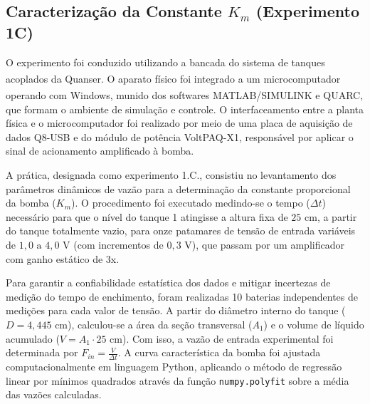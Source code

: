 \documentclass[a4paper,12pt]{article}
\begin{document}
\subsection{Caracterização da Constante $K_m$ (Experimento 1C)}
\begin{justify}
\hspace{4ex}O experimento foi conduzido utilizando a bancada do sistema de tanques acoplados da Quanser\textsuperscript{\textregistered}. O aparato físico foi integrado a um microcomputador operando com Windows, munido dos softwares MATLAB\textsuperscript{\textregistered}/SIMULINK\textsuperscript{\textregistered} e QUARC\textsuperscript{\textregistered}, que formam o ambiente de simulação e controle. O interfaceamento entre a planta física e o microcomputador foi realizado por meio de uma placa de aquisição de dados Q8-USB e do módulo de potência VoltPAQ-X1, responsável por aplicar o sinal de acionamento amplificado à bomba.
\end{justify}

\begin{justify}
\hspace{4ex}A prática, designada como experimento 1.C., consistiu no levantamento dos parâmetros dinâmicos de vazão para a determinação da constante proporcional da bomba ($K_m$). O procedimento foi executado medindo-se o tempo ($\Delta t$) necessário para que o nível do tanque 1 atingisse a altura fixa de $25\text{ cm}$, a partir do tanque totalmente vazio, para onze patamares de tensão de entrada variáveis de $1{,}0\text{ a }4{,}0\text{ V}$ (com incrementos de $0{,}3\text{ V}$), que passam por um amplificador com ganho estático de 3x.
\end{justify}

\begin{justify}
\hspace{4ex}Para garantir a confiabilidade estatística dos dados e mitigar incertezas de medição do tempo de enchimento, foram realizadas 10 baterias independentes de medições para cada valor de tensão. A partir do diâmetro interno do tanque ($D = 4{,}445\text{ cm}$), calculou-se a área da seção transversal ($A_1$) e o volume de líquido acumulado ($V = A_1 \cdot 25\text{ cm}$). Com isso, a vazão de entrada experimental foi determinada por $F_{in} = \frac{V}{\Delta t}$. A curva característica da bomba foi ajustada computacionalmente em linguagem Python, aplicando o método de regressão linear por mínimos quadrados através da função \texttt{numpy.polyfit} sobre a média das vazões calculadas.
\end{justify}
\end{document}
